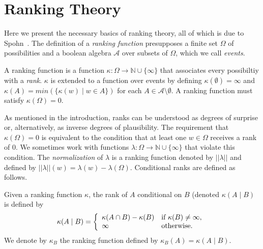 \documentclass{llncs}
\begin{document}
\section{Ranking Theory}\label{sec:rankingtheory}

Here we present the necessary basics of ranking theory, all of which is due to Spohn~\cite{DBLP:books/daglib/0035277}.
The definition of a \emph{ranking function} presupposes a finite set $\Omega$ of possibilities
	and a boolean algebra $\mathcal{A}$ over subsets of $\Omega$, which we call \emph{events}.

\begin{definition}
A ranking function is a function $\kappa: \Omega \rightarrow \mathbb{N} \cup \{\infty\}$ that associates every possibiltiy with a \emph{rank}.
$\kappa$ is extended to a function over events by defining $\kappa(\emptyset) = \infty$ and $\kappa(A) = min( \{ \kappa(w) \mid w \in A \} )$ for each $A \in \mathcal{A} \setminus \emptyset$.
A ranking function must satisfy $\kappa(\Omega) = 0$.
\end{definition}

As mentioned in the introduction, ranks can be understood as degrees of surprise or, alternatively, as inverse degrees of plausibility.
The requirement that $\kappa(\Omega) = 0$ is equivalent to the condition that at least one $w \in \Omega$ receives a rank of 0.
We sometimes work with functions $\lambda: \Omega \rightarrow \mathbb{N} \cup \{\infty\}$ that violate this condition.
The \emph{normalization} of $\lambda$ is a ranking function denoted by $|| \lambda ||$ and defined by $|| \lambda ||(w) = \lambda(w) - \lambda(\Omega)$.
Conditional ranks are defined as follows.

\begin{definition}\label{def:conditional}
Given a ranking function $\kappa$, the rank of $A$ conditional on $B$ (denoted $\kappa(A \mid B)$ is defined by
\[
                \kappa(A \mid B) = \left\{ \begin{array}{ll}
                 \kappa(A \cap B) - \kappa(B)& \mbox{if $\kappa(B) \not = \infty$,} \\
                 \infty & \mbox{otherwise.} \\
                   \end{array}
                  \right. \\
\] 
We denote by $\kappa_{B}$ the ranking function defined by $\kappa_{B}(A) = \kappa(A \mid B)$.
\end{definition}
\end{document}
